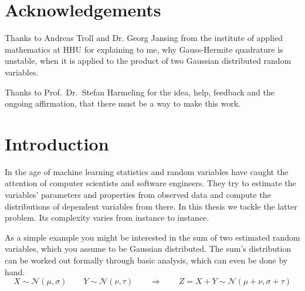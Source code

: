 \documentclass[11pt,a4paper]{book}
\begin{document}
\cleardoublepage

\chapter*{Acknowledgements}

Thanks to Andreas Troll and Dr. Georg Jansing from the institute of applied
mathematics at HHU for explaining to me, why Gauss-Hermite quadrature is
unstable, when it is applied to the product of two Gaussian distributed random
variables.

Thanks to Prof.~Dr.~Stefan Harmeling for the idea, help, feedback and the
ongoing affirmation, that there must be a way to make this work.

\tableofcontents

\cleardoublepage

\mainmatter
\pagestyle{fancy}

\chapter{Introduction}

In the age of machine learning statistics and random variables have caught the
attention of computer scientists and software engineers. They try to estimate
the variables' parameters and properties from observed data and compute the
distributions of dependent variables from there. In this thesis we tackle the
latter problem. Its complexity varies from instance to instance.

As a simple example you might be interested in the sum of two estimated random
variables, which you assume to be Gaussian distributed. The sum's distribution
can be worked out formally through basic analysis, which can even be done by
hand.
\begin{equation*}
  X \sim \mathcal{N}(\mu, \sigma) \qquad Y \sim \mathcal{N}(\nu, \tau) \qquad \Rightarrow \qquad Z = X + Y \sim \mathcal{N}(\mu + \nu, \sigma + \tau)
\end{equation*}
\end{document}
